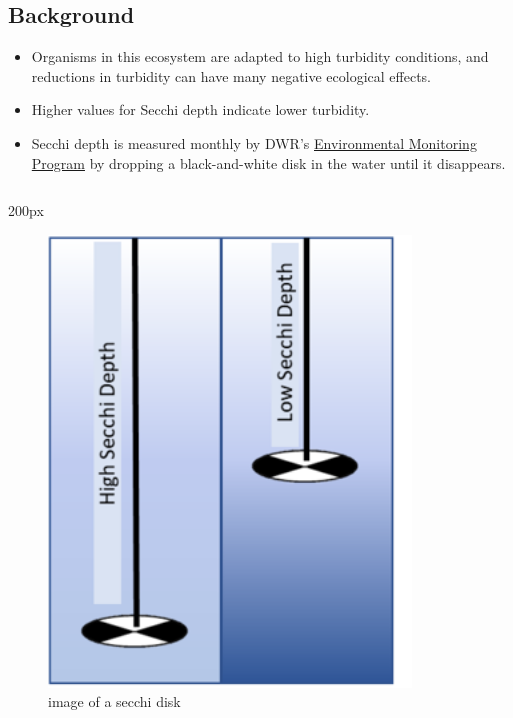 \documentclass[
]{book}
\providecommand{\tightlist}{%
  \setlength{\itemsep}{0pt}\setlength{\parskip}{0pt}}
\begin{document}
\begin{column}{0.7\textwidth}
\hypertarget{background-18}{%
\subsection{Background}\label{background-18}}

\begin{itemize}
\tightlist
\item
  Organisms in this ecosystem are adapted to high turbidity conditions, and reductions in turbidity can have many negative ecological effects.
\item
  Higher values for Secchi depth indicate lower turbidity.
\item
  Secchi depth is measured monthly by DWR's \href{https://emp.baydeltalive.com/wiki/12297}{Environmental Monitoring Program} by dropping a black-and-white disk in the water until it disappears.
\end{itemize}
\end{column}

\begin{column}{200px\textwidth}
\begin{figure}

{\centering \includegraphics[width=3.79in]{figures/secchidisc} 

}

\caption{image of a secchi disk}\label{fig:unnamed-chunk-144}
\end{figure}
\end{column}
\end{document}
